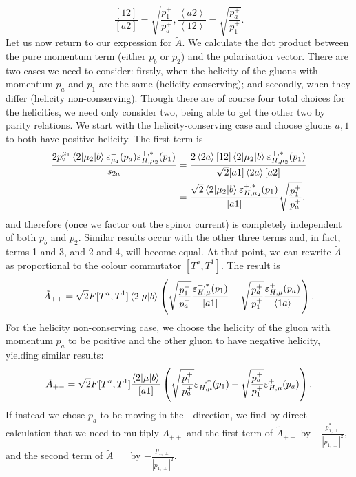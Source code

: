 \begin{subequations}
\begin{equation}
\frac{[12]}{[a2]} = \sqrt{\frac{p_1^+}{p_a^+}},
\end{equation}
\begin{equation}
\frac{\left<a2\right>}{\left<12\right>} = \sqrt{\frac{p_a^+}{p_1^+}}.
\end{equation}
\end{subequations}
Let us now return to our expression for $\tilde{A}$. We calculate the dot product between the pure momentum term (either $p_b$ or $p_2$) and the polarisation vector. There are two cases we need to consider: firstly, when the helicity of the gluons with momentum $p_a$ and $p_1$ are the same (helicity-conserving); and secondly, when they differ (helicity non-conserving). Though there are of course four total choices for the helicities, we need only consider two, being able to get the other two by parity relations. We start with the helicity-conserving case and choose gluons $a,1$ to both have positive helicity. The first term is 
\begin{equation}
\begin{split}
 \frac{2 p_2^{\mu_1} \mathinner{\langle2\vert\mu_2\vert b\rangle}_{} \varepsilon_{\mu_1}^+ (p_a) \varepsilon_{H,\mu_2}^{+,*}(p_1)}{s_{2a}} &= \frac{2 \left<2 a \right> [1 2] \mathinner{\langle2\vert\mu_2\vert b\rangle}_{}\varepsilon_{H,\mu_2}^{+,*}(p_1)}{\sqrt{2}[a 1] \left<2 a \right> [a 2]} \\
 &= \frac{\sqrt{2}\mathinner{\langle2\vert\mu_2\vert b\rangle}_{}\varepsilon_{H,\mu_2}^{+,*}(p_1)}{[a1]} \sqrt{\frac{p_1^+}{p_a^+}},
 \end{split}
\end{equation}
and therefore (once we factor out the spinor current) is completely independent of both $p_b$ and $p_2$. Similar results occur with the other three terms and, in fact, terms 1 and 3, and 2 and 4, will become equal. At that point, we can rewrite $\tilde{A}$ as proportional to the colour commutator $[T^a,T^1]$. The result is
\begin{equation}
\tilde{A}_{++} = \sqrt{2} F [T^a,T^1] \mathinner{\langle2\vert\mu\vert b\rangle}_{} \left(\sqrt{\frac{p_1^+}{p_a^+}}\frac{\varepsilon_{H,\mu}^{+,*}(p_1)}{[a1]} - \sqrt{\frac{p_a^+}{p_1^+}}\frac{\varepsilon_{H,\mu}^{+}(p_a)}{ \left<1 a \right>} \right).
\end{equation}
For the helicity non-conserving case, we choose the helicity of the gluon with momentum $p_a$ to be positive and the other gluon to have negative helicity, yielding similar results:
\begin{equation}
\tilde{A}_{+-} = \sqrt{2} F [T^a,T^1] \frac{\mathinner{\langle2\vert\mu\vert b\rangle}_{}}{[a1]} \left(\sqrt{\frac{p_1^+}{p_a^+}}\varepsilon_{H,\mu}^{-,*}(p_1) - \sqrt{\frac{p_a^+}{p_1^+}}\varepsilon_{H,\mu}^{+}(p_a) \right).
\end{equation}
If instead we chose $p_a$ to be moving in the - direction, we find by direct calculation that we need to multiply $\tilde{A}_{++}$ and the first term of $\tilde{A}_{+-}$ by $-\frac{p_{1,\perp}^*}{|p_{1,\perp}|^2}$, and the second term of $\tilde{A}_{+-}$ by $-\frac{p_{1,\perp}}{|p_{1,\perp}|^2}$. 

